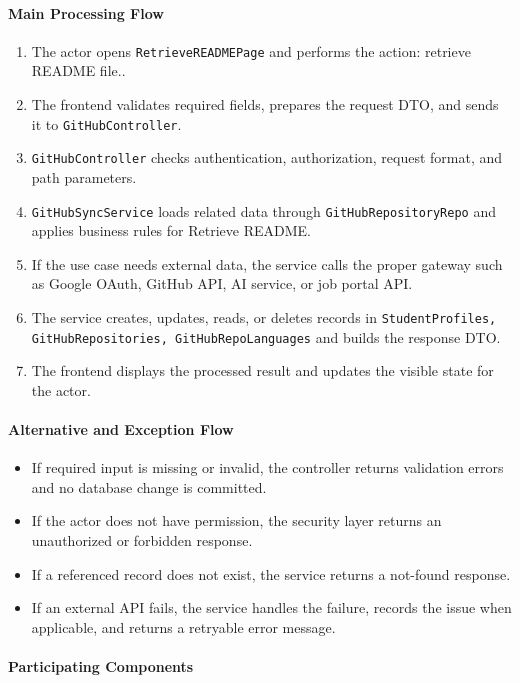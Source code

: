 \paragraph{Main Processing Flow}

\begin{enumerate}
    \item The actor opens \texttt{RetrieveREADMEPage} and performs the action: retrieve README file..
    \item The frontend validates required fields, prepares the request DTO, and sends it to \texttt{GitHubController}.
    \item \texttt{GitHubController} checks authentication, authorization, request format, and path parameters.
    \item \texttt{GitHubSyncService} loads related data through \texttt{GitHubRepositoryRepo} and applies business rules for Retrieve README.
    \item If the use case needs external data, the service calls the proper gateway such as Google OAuth, GitHub API, AI service, or job portal API.
    \item The service creates, updates, reads, or deletes records in \texttt{StudentProfiles, GitHubRepositories, GitHubRepoLanguages} and builds the response DTO.
    \item The frontend displays the processed result and updates the visible state for the actor.
\end{enumerate}

\paragraph{Alternative and Exception Flow}

\begin{itemize}
    \item If required input is missing or invalid, the controller returns validation errors and no database change is committed.
    \item If the actor does not have permission, the security layer returns an unauthorized or forbidden response.
    \item If a referenced record does not exist, the service returns a not-found response.
    \item If an external API fails, the service handles the failure, records the issue when applicable, and returns a retryable error message.
\end{itemize}

\paragraph{Participating Components}

